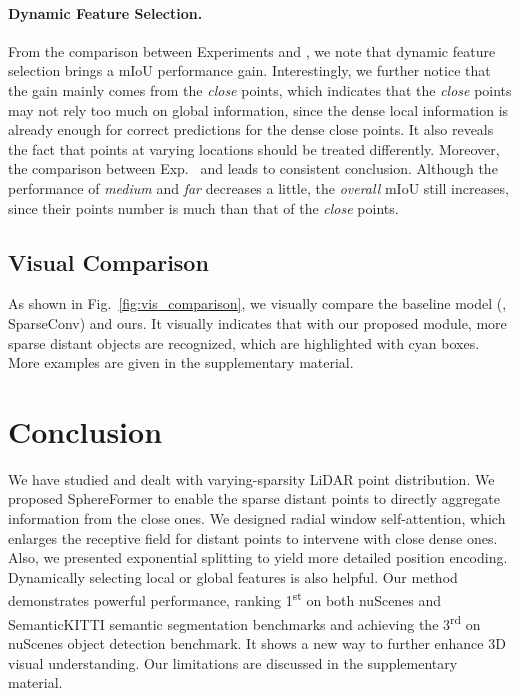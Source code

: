 \documentclass[10pt,twocolumn,letterpaper]{article}
\begin{document}
\vspace{-0.1cm}
\paragraph{Dynamic Feature Selection.}
From the comparison between Experiments \uppercase\expandafter{} and \uppercase\expandafter{}, we note that dynamic feature selection brings a  mIoU performance gain. Interestingly, we further notice that the gain mainly comes from the \textit{close} points, which indicates that the \textit{close} points may not rely too much on global information, since the dense local information is already enough for correct predictions for the dense close points. It also reveals the fact that points at varying locations should be treated differently. Moreover, the comparison between Exp.~\uppercase\expandafter{} and \uppercase\expandafter{} leads to consistent conclusion. Although the performance of \textit{medium} and \textit{far} decreases a little, the \textit{overall} mIoU still increases, since their points number is much than that of the \textit{close} points.



\subsection{Visual Comparison}
\label{sec:vis_comp}
As shown in Fig.~\ref{fig:vis_comparison}, we visually compare the baseline model (\ie, SparseConv) and ours. It visually indicates that with our proposed module, more sparse distant objects are recognized, which are highlighted with cyan boxes. More examples are given in the supplementary material.

\section{Conclusion}

We have studied and dealt with varying-sparsity LiDAR point distribution. We proposed SphereFormer to enable the sparse distant points to directly aggregate information from the close ones. We designed radial window self-attention, which enlarges the receptive field for distant points to intervene with close dense ones. Also, we presented exponential splitting to yield more detailed position encoding. Dynamically selecting local or global features is also helpful. Our method demonstrates powerful performance, ranking 1\textsuperscript{st} on both nuScenes and SemanticKITTI semantic segmentation benchmarks and achieving the 3\textsuperscript{rd} on nuScenes object detection benchmark. It shows a new way to further enhance 3D visual understanding. Our limitations are discussed in the supplementary material.

{\small


}
\end{document}
